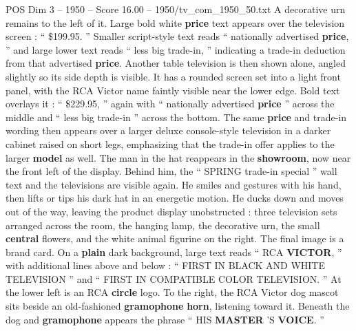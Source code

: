 \begin{textsample}{POS Dim 3 – 1950 – Score 16.00 – 1950/tv\_com\_1950\_50.txt}
A decorative urn remains to the left of it.
Large bold white \textbf{price} text appears over the television screen : “ \$199.95. ” Smaller script-style text reads “ nationally advertised \textbf{price}, ” and large lower text reads “ less big trade-in, ” indicating a trade-in deduction from that advertised \textbf{price}.
Another table television is then shown alone, angled slightly so its side depth is visible.
It has a rounded screen set into a light front panel, with the RCA Victor name faintly visible near the lower edge.
Bold text overlays it : “ \$229.95, ” again with “ nationally advertised \textbf{price} ” across the middle and “ less big trade-in ” across the bottom.
The same \textbf{price} and trade-in wording then appears over a larger deluxe console-style television in a darker cabinet raised on short legs, emphasizing that the trade-in offer applies to the larger \textbf{model} as well.
The man in the hat reappears in the \textbf{showroom}, now near the front left of the display.
Behind him, the “ SPRING trade-in special ” wall text and the televisions are visible again.
He smiles and gestures with his hand, then lifts or tips his dark hat in an energetic motion.
He ducks down and moves out of the way, leaving the product display unobstructed : three television sets arranged across the room, the hanging lamp, the decorative urn, the small \textbf{central} flowers, and the white animal figurine on the right.
The final image is a brand card.
On a \textbf{plain} dark background, large text reads “ RCA \textbf{VICTOR}, ” with additional lines above and below : “ FIRST IN BLACK AND WHITE TELEVISION ” and “ FIRST IN COMPATIBLE COLOR TELEVISION. ” At the lower left is an RCA \textbf{circle} logo.
To the right, the RCA Victor dog mascot sits beside an old-fashioned \textbf{gramophone} \textbf{horn}, listening toward it.
Beneath the dog and \textbf{gramophone} appears the phrase “ HIS \textbf{MASTER} ’S \textbf{VOICE}. ”

\end{textsample}
